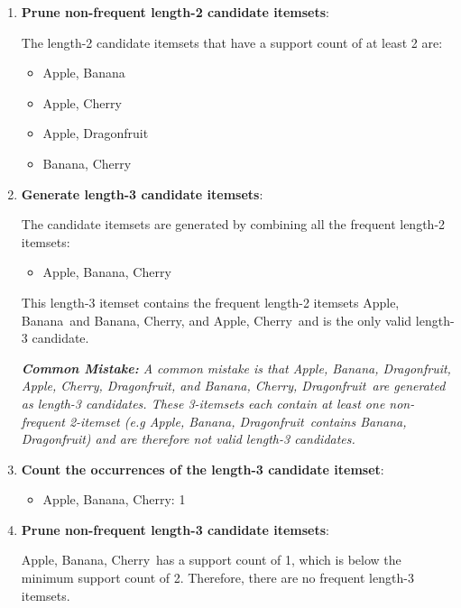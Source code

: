 \documentclass[
english,
smallborders
]{i6prcsht}
\begin{document}
\begin{solution}
\begin{enumerate}
		\item \textbf{Prune non-frequent length-2 candidate itemsets}:
		      
		      The length-2 candidate itemsets that have a support count of at least 2 are:
		      
		      \begin{itemize}
			      \item Apple, Banana
			      \item Apple, Cherry
			      \item Apple, Dragonfruit
			      \item Banana, Cherry
		      \end{itemize}
		      
		\item \textbf{Generate length-3 candidate itemsets}:
		      
		      The candidate itemsets are generated by combining all the frequent length-2 itemsets:
		      
		      \begin{itemize}
			      \item Apple, Banana, Cherry
		      \end{itemize}
		      
		      This length-3 itemset contains the frequent length-2 itemsets \glqq Apple, Banana\grqq\ and \glqq Banana, Cherry\grqq , and \glqq Apple, Cherry\grqq\ and is the only valid length-3 candidate.
		      
		      \textit{\textbf{Common Mistake:} A common mistake is that \glqq Apple, Banana, Dragonfruit\grqq , \glqq Apple, Cherry, Dragonfruit\grqq , and \glqq Banana, Cherry, Dragonfruit\grqq\ are generated as length-3 candidates. These 3-itemsets each contain at least one non-frequent 2-itemset (e.g \glqq Apple, Banana, Dragonfruit\grqq\ contains \glqq Banana, Dragonfruit\grqq ) and are therefore not valid length-3 candidates.}
		      
		\item \textbf{Count the occurrences of the length-3 candidate itemset}:
		      
		      \begin{itemize}
			      \item Apple, Banana, Cherry: 1
		      \end{itemize}
		      
		\item \textbf{Prune non-frequent length-3 candidate itemsets}:
		      
		      \glqq Apple, Banana, Cherry\grqq\ has a support count of 1, which is below the minimum support count of 2. Therefore, there are no frequent length-3 itemsets.
		      

\end{enumerate}
\end{solution}
\end{document}
